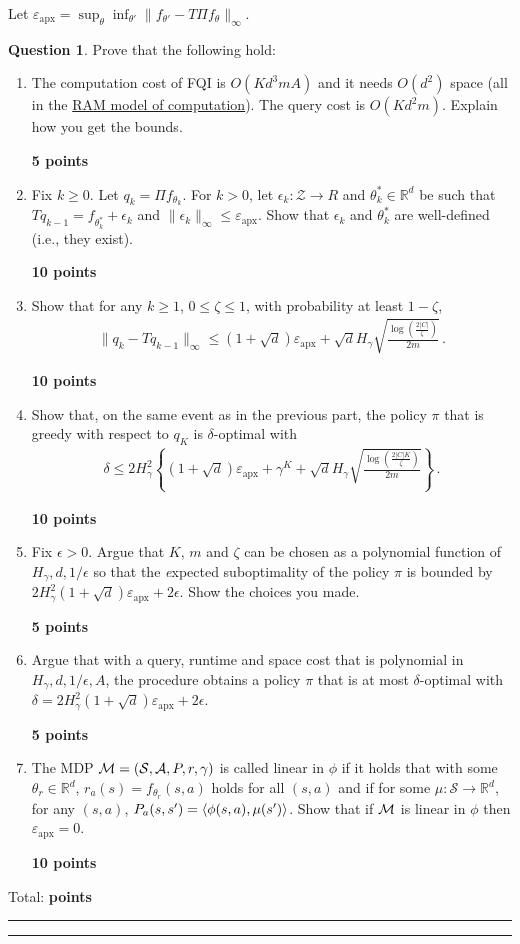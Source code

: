 \documentclass{article}
\newcommand{\norm}[1]{\| #1 \|}
\newcommand{\R}{\mathbb{R}}
\newcommand{\cZ}{\mathcal{Z}}
\DeclareMathOperator*{\1}{\mathbbm{1}}
\newcommand{\0}{\mathbf{0}}
\newcounter{DocPoints} %
\newcounter{QuestionPoints} %
\newcommand{\points}[1]{%
	\par\mbox{}\par\noindent\hfill {\bf #1 points}%
	\addtocounter{DocPoints}{#1}
	\addtocounter{QuestionPoints}{#1}
}
\newcommand{\tpoints}[1]{        %
	\ifthenelse{\isempty{#1}}%
	{%
	}%
	{%
		\addtocounter{DocPoints}{#1}
		\addtocounter{QuestionPoints}{#1}
	}													 %
	\par\mbox{}\par\noindent\hfill {Total: \bf \arabic{QuestionPoints}\xspace points}\par\mbox{}\par\hrule\hrule
	\setcounter{QuestionPoints}{0}
}
\theoremstyle{definition}
\newtheorem{question}{Question}
\theoremstyle{remark}
\theoremstyle{theorem}
\newcommand{\cS}{\mathcal{S}}
\newcommand{\cA}{\mathcal{A}}
\begin{document}
\newcommand{\epx}{\varepsilon_{\textrm{apx}}}
Let $\epx = \sup_{\theta} \inf_{\theta'} \norm{  f_{\theta'} - T \Pi f_{\theta} }_\infty$.
\begin{question}
Prove that the following hold:
\begin{enumerate}
\item The computation cost of FQI is $O(K d^3 m A)$ and it needs $O(d^2)$ space (all in the \href{https://en.wikipedia.org/wiki/Random-access_machine}{RAM model of computation}). The query cost is $O(K d^2 m)$. Explain how you get the bounds.
\points{5}
\item Fix $k\ge 0$. 
Let $q_k = \Pi f_{\theta_k}$. For $k>0$, let $\epsilon_k:\cZ \to R$ and $\theta_k^*\in \R^d$ 
be such that 
$T q_{k-1}= f_{\theta_k^*}+\epsilon_k$ 
and $\norm{\epsilon_k}_\infty \le \epx$. Show that $\epsilon_k$ and $\theta_k^*$ are well-defined (i.e., they exist).
\points{10}
\item Show that for any  $k\ge 1$, $0\le \zeta\le 1$, with probability at least $1-\zeta$,
\begin{align*}
\norm{q_k - T q_{k-1}}_\infty \le (1+\sqrt{d}) \epx + \sqrt{d} H_\gamma \sqrt{\frac{\log\left(\frac{2|C|}{\zeta}\right)}{2m}}\,.
\end{align*}
\points{10}
\item Show that, on the same event as in the previous part, the policy $\pi$ that is greedy with respect to $q_K$ is $\delta$-optimal with 
\begin{align*}
\delta \le 2 H_\gamma^2
\left\{
(1+\sqrt{d}) \epx +
 \gamma^K 
+ \sqrt{d} H_\gamma \sqrt{\frac{\log\left(\frac{2|C| K}{\zeta}\right)}{2m}} \right\}\,.
\end{align*}
\points{10}
\item 
Fix $\epsilon>0$.
Argue that $K$, $m$ and $\zeta$ can be chosen
as a polynomial function of $H_\gamma,d, 1/\epsilon$
so that the {\emph expected} suboptimality of the policy $\pi$ is bounded by
$2H_\gamma^2 (1+\sqrt{d})\epx + 2\epsilon$.  Show the choices you made.
\points{5}
\item Argue that with a query, runtime and space cost that is polynomial in $H_\gamma,d, 1/\epsilon,A$, 
the procedure obtains a policy $\pi$ that is at most $\delta$-optimal with
$\delta=2H_\gamma^2 (1+\sqrt{d})\epx + 2\epsilon$.
\points{5}
\item The MDP $\cM = (\cS,\cA,P,r,\gamma)$ is called linear in $\phi$ if it holds that with some $\theta_r\in \R^d$, $r_a(s) = f_{\theta_r}(s,a)$ holds for all $(s,a)$ and if for some $\mu:\cS \to \R^d$, 
 for any $(s,a)$,
$P_a(s,s') = \langle \phi(s,a), \mu(s') \rangle$. Show that if $\mathcal{M}$ is linear in $\phi$ then $\epx = 0$.
\points{10}
\end{enumerate}
\tpoints{}
\end{question}
\end{document}
